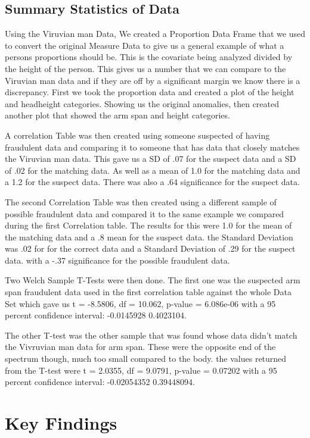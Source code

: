 \documentclass[]{article}
\begin{document}
\subsection{Summary Statistics of Data}

Using the Viruvian man Data, We created a Proportion Data Frame that we
used to convert the original Measure Data to give us a general example
of what a persons proportions should be. This is the covariate being
analyzed divided by the height of the person. This gives us a number
that we can compare to the Viruvian man data and if they are off by a
significant margin we know there is a discrepancy. First we took the
proportion data and created a plot of the height and headheight
categories. Showing us the original anomalies, then created another plot
that showed the arm span and height categories.

A correlation Table was then created using someone suspected of having
fraudulent data and comparing it to someone that has data that closely
matches the Viruvian man data. This gave us a SD of .07 for the suspect
data and a SD of .02 for the matching data. As well as a mean of 1.0 for
the matching data and a 1.2 for the suspect data. There was also a .64
significance for the suspect data.

The second Correlation Table was then created using a different sample
of possible fraudulent data and compared it to the same example we
compared during the first Correlation table. The results for this were
1.0 for the mean of the matching data and a .8 mean for the suspect
data. the Standard Deviation was .02 for for the correct data and a
Standard Deviation of .29 for the suspect data. with a -.37 significance
for the possible fraudulent data.

Two Welch Sample T-Tests were then done. The first one was the suspected
arm span fraudulent data used in the first correlation table against the
whole Data Set which gave us t = -8.5806, df = 10.062, p-value =
6.086e-06 with a 95 percent confidence interval: -0.0145928 0.4023104.

The other T-test was the other sample that was found whose data didn't
match the Vivruvian man data for arm span. These were the opposite end
of the spectrum though, much too small compared to the body. the values
returned from the T-test were t = 2.0355, df = 9.0791, p-value = 0.07202
with a 95 percent confidence interval: -0.02054352 0.39448094.

\label{sec:data-summary}

\section{Key Findings}
\end{document}
